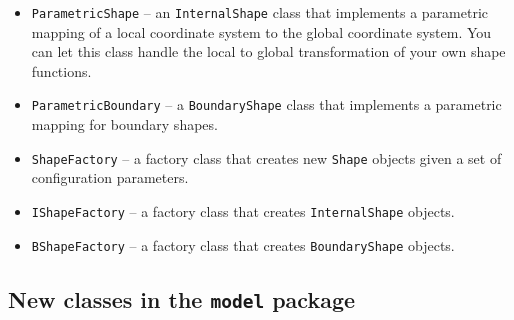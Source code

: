 \documentclass[a4paper,11pt]{article}
\newcommand{\Code}[1]{\texttt{#1}}
\begin{document}
\begin{itemize}

\item \Code{ParametricShape} -- an \Code{Internal\-Shape} class that
  implements a parametric mapping of a local coordinate system to the
  global coordinate system. You can let this class handle the local to
  global transformation of your own shape functions.

\item \Code{ParametricBoundary} -- a \Code{Boundary\-Shape} class that
  implements a parametric mapping for boundary shapes.

\item \Code{ShapeFactory} -- a factory class that creates new
  \Code{Shape} objects given a set of configuration parameters.

\item \Code{IShapeFactory} -- a factory class that creates
  \Code{InternalShape} objects.

\item \Code{BShapeFactory} -- a factory class that creates
  \Code{BoundaryShape} objects.

\end{itemize}



\subsection{New classes in the \Code{model} package}
\end{document}

